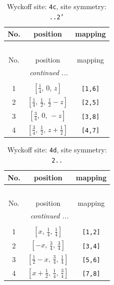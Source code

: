\documentclass[fleqn,8pt]{jsarticle}
\begin{document}
\renewcommand{\arraystretch}{1.2}
\begin{longtable}{ccc}
\caption{Wyckoff site: {\tt 4c}, site symmetry: {\tt ..2'}}
 \\
 \hline \hline
No. & position & mapping \\ \hline \endfirsthead

\multicolumn{2}{l}{\tablename\ \thetable{}} \\
 \hline \hline
No. & position & mapping \\ \hline \endhead

 \hline \hline
\multicolumn{2}{r}{\footnotesize\it continued ...} \\ \endfoot

 \hline \hline
\multicolumn{2}{r}{} \\ \endlastfoot

1 & $\left[ \frac{1}{4},\, 0,\, z \right]$ & {\tt [1,6]} \\ \hline
2 & $\left[ \frac{1}{4},\, \frac{1}{2},\, \frac{1}{2} - z \right]$ & {\tt [2,5]} \\ \hline
3 & $\left[ \frac{3}{4},\, 0,\, - z \right]$ & {\tt [3,8]} \\ \hline
4 & $\left[ \frac{3}{4},\, \frac{1}{2},\, z + \frac{1}{2} \right]$ & {\tt [4,7]} \\
\end{longtable}
\renewcommand{\arraystretch}{1.2}
\begin{longtable}{ccc}
\caption{Wyckoff site: {\tt 4d}, site symmetry: {\tt 2..}}
 \\
 \hline \hline
No. & position & mapping \\ \hline \endfirsthead

\multicolumn{2}{l}{\tablename\ \thetable{}} \\
 \hline \hline
No. & position & mapping \\ \hline \endhead

 \hline \hline
\multicolumn{2}{r}{\footnotesize\it continued ...} \\ \endfoot

 \hline \hline
\multicolumn{2}{r}{} \\ \endlastfoot

1 & $\left[ x,\, \frac{1}{4},\, \frac{1}{4} \right]$ & {\tt [1,2]} \\ \hline
2 & $\left[ - x,\, \frac{3}{4},\, \frac{3}{4} \right]$ & {\tt [3,4]} \\ \hline
3 & $\left[ \frac{1}{2} - x,\, \frac{3}{4},\, \frac{1}{4} \right]$ & {\tt [5,6]} \\ \hline
4 & $\left[ x + \frac{1}{2},\, \frac{1}{4},\, \frac{3}{4} \right]$ & {\tt [7,8]} \\
\end{longtable}
\end{document}
